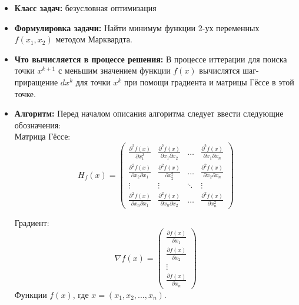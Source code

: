\begin{itemize}
    \item {\bfseries Класс задач:} безусловная оптимизация
    
    
    \item {\bfseries Формулировка задачи:} Найти минимум функции 2-ух переменных $f(x_1, x_2)$ методом Марквардта.
    
    
    \item {\bfseries Что вычисляется в процессе решения:}
    В процессе иттерации для поиска точки $x^{k+1}$ с меньшим значением функции $f(x)$ вычислятся шаг-приращение $dx^k$ для точки $x^k$ при помощи градиента и матрицы Гёссе в этой точке.
    
    
    \item {\bfseries Алгоритм:}
    Перед началом описания алгоритма следует ввести следующие обозначения: \\
    Матрица Гёссе:
    \begin{equation*}
    H_{f}(x) = \left(
    \begin{array}{cccc}
        \frac{\partial^2 f(x)}{\partial x^{2}_{1}} & \frac{\partial^2 f(x)}{\partial x_1 \partial x_2} & \ldots & \frac{\partial^2 f(x)}{\partial x_1 \partial x_n}\\
        \frac{\partial^2 f(x)}{\partial x_{2} \partial x_1} & \frac{\partial^2 f(x)}{\partial x^{2}_{2}} & \ldots & \frac{\partial^2 f(x)}{\partial x_2 \partial x_n}\\
        \vdots & \vdots & \ddots & \vdots\\
        \frac{\partial^2 f(x)}{\partial x_n \partial x_1} & \frac{\partial^2 f(x)}{\partial x_n \partial x_2} & \ldots & \frac{\partial^2 f(x)}{\partial x^{2}_{n}}
    \end{array}
    \right)
    \end{equation*}
    
    Градиент:
    \begin{equation*}
    \nabla f(x) = \left(
    \begin{array}{cccc}
        \frac{\partial f(x)}{\partial x_1}\\
        \frac{\partial f(x)}{\partial x_2}\\
        \vdots\\
        \frac{\partial f(x)}{\partial x_n}
    \end{array}
    \right)
    \end{equation*}
    Функции $f(x)$, где $x = (x_1, x_2, ..., x_n)$. \\
    

\end{itemize}
